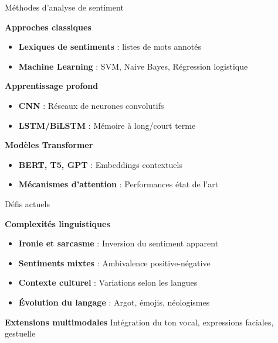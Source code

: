 \begin{frame}{Méthodes d'analyse de sentiment}
    \begin{block}{\centering \textbf{Approches classiques}}
        \begin{itemize}
            \setlength\itemsep{0.4em}
            \item \textbf{Lexiques de sentiments} : listes de mots annotés
            \item \textbf{Machine Learning} : SVM, Naive Bayes, Régression logistique
        \end{itemize}
    \end{block}
    
    \begin{block}{\centering \textbf{Apprentissage profond}}
        \begin{itemize}
            \setlength\itemsep{0.4em}
            \item \textbf{CNN} : Réseaux de neurones convolutifs
            \item \textbf{LSTM/BiLSTM} : Mémoire à long/court terme
        \end{itemize}
    \end{block}
    
    \begin{block}{\centering \textbf{Modèles Transformer}}
        \begin{itemize}
            \setlength\itemsep{0.4em}
            \item \textbf{BERT, T5, GPT} : Embeddings contextuels
            \item \textbf{Mécanismes d'attention} : Performances état de l'art
        \end{itemize}
    \end{block}
\end{frame}

\begin{frame}{Défis actuels}
    \begin{alertblock}{\centering \textbf{Complexités linguistiques}}
        \begin{itemize}
            \setlength\itemsep{0.5em}
            \item \textbf{Ironie et sarcasme} : Inversion du sentiment apparent
            \item \textbf{Sentiments mixtes} : Ambivalence positive-négative
            \item \textbf{Contexte culturel} : Variations selon les langues
            \item \textbf{Évolution du langage} : Argot, émojis, néologismes
        \end{itemize}
    \end{alertblock}

    \vspace{0.3cm}
    
    \begin{block}{\centering \textbf{Extensions multimodales}}
        \centering
        Intégration du ton vocal, expressions faciales, gestuelle
    \end{block}
\end{frame}



